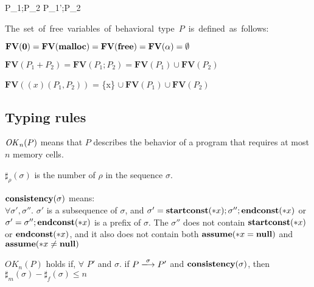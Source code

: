 
{P_{1};P_{2} \xlongrightarrow{\rho} P_{1}';P_{2}}

\begin{myDef}
  \label{df:fv}
  \mbox{The set of free variables of behavioral type \(P\) is defined as
    follows:}

  \( \mathbf{FV}(\bf{0}) = \mathbf{FV}(\mathbf{malloc}) =
  \mathbf{FV}(\mathbf{free}) = \mathbf{FV}(\alpha) = \emptyset \) 

  \( \mathbf{FV}(P_1 + P_2) = \mathbf{FV}(P_1;P_2) = \mathbf{FV}(P_1) \cup \mathbf{FV}(P_2)\)

  \( \mathbf{FV}((x)(P_1,P_2)) \) = \{x\} \(\cup \ \mathbf{FV}(P_1) \cup
  \mathbf{FV}(P_2)\)
\end{myDef}


\subsection{Typing rules}

\(\mathit{OK}_n(P)\) means that \(P\) describes
the behavior of a program that requires at most \(n\) memory cells.

\begin{myDef}[\(\sharp_{\rho}(\sigma)\)]
\label{df:sharf}
\(\sharp_{\rho}(\sigma)\) is the number of \(\rho\) in the sequence
\(\sigma\).
\end{myDef}


\begin{myDef}
\label{df:const}
\(\mathbf{consistency}(\sigma)\) means:\\
\( \forall \sigma',\sigma''\). \(\sigma'\) is a subsequence
of \(\sigma\), and \(\sigma' = \mathbf{startconst}(*x);\sigma'';\mathbf{endconst}(*x)\) or \(\sigma' = \sigma'';\mathbf{endconst}(*x)\) is a prefix of \(\sigma\). The \(\sigma''\) does not contain \(\mathbf{startconst}(*x)\) or \(\mathbf{endconst}(*x) \), and it also does not contain both \(\mathbf{assume}(*x = \mathbf{null})\) and \(\mathbf{assume}(*x \ne \mathbf{null})\) 
\end{myDef}


\begin{myDef}
\label{df:okn}
\(OK_{n}(P)\) holds if, \(\forall\) \(P'\) and \(\sigma\). if \(P
\xlongrightarrow{\sigma}P'\) and \(\mathbf{consistency}(\sigma)\), then \( \sharp_m(\sigma) - \sharp_f(\sigma) \le n\) 
\end{myDef}


